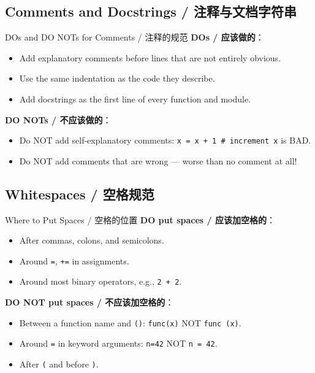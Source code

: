 \documentclass[11pt,a4paper]{report}
\let\oldtexttt\texttt
\renewcommand{\texttt}[1]{\textcolor{mainblue}{\oldtexttt{#1}}}
\begin{document}
\subsection{Comments and Docstrings / 注释与文档字符串}

\begin{warning}{DOs and DO NOTs for Comments / 注释的规范}
    \textbf{DOs / 应该做的}：
    \begin{itemize}
        \item Add explanatory comments before lines that are not entirely obvious.
        \item Use the same indentation as the code they describe.
        \item Add docstrings as the first line of every function and module.
    \end{itemize}

    \textbf{DO NOTs / 不应该做的}：
    \begin{itemize}
        \item Do NOT add self-explanatory comments: \texttt{x = x + 1  \# increment x} is BAD.
        \item Do NOT add comments that are wrong — worse than no comment at all!
    \end{itemize}
\end{warning}

\subsection{Whitespaces / 空格规范}

\begin{concept}{Where to Put Spaces / 空格的位置}
    \textbf{DO put spaces / 应该加空格的}：
    \begin{itemize}
        \item After commas, colons, and semicolons.
        \item Around \texttt{=}, \texttt{+=} in assignments.
        \item Around most binary operators, e.g., \texttt{2 + 2}.
    \end{itemize}

    \textbf{DO NOT put spaces / 不应该加空格的}：
    \begin{itemize}
        \item Between a function name and \texttt{()}: \texttt{func(x)} NOT \texttt{func (x)}.
        \item Around \texttt{=} in keyword arguments: \texttt{n=42} NOT \texttt{n = 42}.
        \item After \texttt{(} and before \texttt{)}.
    \end{itemize}
\end{concept}
\end{document}
